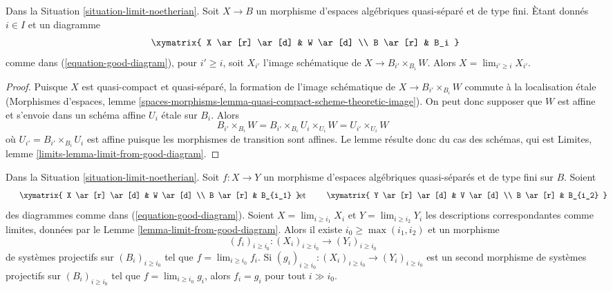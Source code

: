 \begin{lemma}
\label{lemma-limit-from-good-diagram}
Dans la Situation \ref{situation-limit-noetherian}.
Soit $X \to B$ un morphisme d'espaces alg\'ebriques
quasi-s\'epar\'e et de type fini. \`Etant donn\'es $i \in I$ et un diagramme
$$
\vcenter{
\xymatrix{
X \ar[r] \ar[d] & W \ar[d] \\
B \ar[r] & B_i
}
}
$$
comme dans (\ref{equation-good-diagram}), pour $i' \geq i$, soit
$X_{i'}$ l'image sch\'ematique de $X \to B_{i'} \times_{B_i} W$.
Alors $X = \lim_{i' \geq i} X_{i'}$.
\end{lemma}

\begin{proof}
Puisque $X$ est quasi-compact et quasi-s\'epar\'e, la formation de
l'image sch\'ematique de $X \to B_{i'} \times_{B_i} W$
commute \`a la localisation \'etale
(Morphismes d'espaces, lemme
\ref{spaces-morphisms-lemma-quasi-compact-scheme-theoretic-image}).
On peut donc supposer que $W$ est affine et s'envoie dans un sch\'ema affine
$U_i$ \'etale sur $B_i$. Alors
$$
B_{i'} \times_{B_i} W =
B_{i'} \times_{B_i} U_i \times_{U_i} W =
U_{i'} \times_{U_i} W
$$
o\`u $U_{i'} = B_{i'} \times_{B_i} U_i$ est affine puisque les morphismes de
transition sont affines. Le lemme r\'esulte donc du cas des sch\'emas,
qui est
Limites, lemme \ref{limits-lemma-limit-from-good-diagram}.
\end{proof}

\begin{lemma}
\label{lemma-morphism-good-diagram}
Dans la Situation \ref{situation-limit-noetherian}.
Soit $f : X \to Y$ un morphisme d'espaces alg\'ebriques quasi-s\'epar\'es
et de type fini sur $B$. Soient
$$
\vcenter{
\xymatrix{
X \ar[r] \ar[d] & W \ar[d] \\
B \ar[r] & B_{i_1}
}
}
\quad\text{et}\quad
\vcenter{
\xymatrix{
Y \ar[r] \ar[d] & V \ar[d] \\
B \ar[r] & B_{i_2}
}
}
$$
des diagrammes comme dans (\ref{equation-good-diagram}). Soient
$X = \lim_{i \geq i_1} X_i$ et
$Y = \lim_{i \geq i_2} Y_i$ les descriptions correspondantes
comme limites, donn\'ees par le Lemme \ref{lemma-limit-from-good-diagram}.
Alors il existe $i_0 \geq \max(i_1, i_2)$ et un morphisme
$$
(f_i)_{i \geq i_0} : (X_i)_{i \geq i_0} \to (Y_i)_{i \geq i_0}
$$
de syst\`emes projectifs sur $(B_i)_{i \geq i_0}$ tel que
$f = \lim_{i \geq i_0} f_i$.
Si $(g_i)_{i \geq i_0} : (X_i)_{i \geq i_0} \to (Y_i)_{i \geq i_0}$
est un second morphisme de syst\`emes projectifs sur $(B_i)_{i \geq i_0}$ tel que
$f = \lim_{i \geq i_0} g_i$,
alors $f_i = g_i$ pour tout $i \gg i_0$.
\end{lemma}

